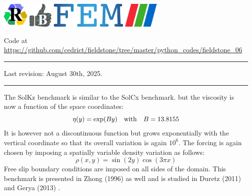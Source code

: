 \noindent
\includegraphics[height=1.25cm]{images/pictograms/replication}
\includegraphics[height=1.25cm]{images/pictograms/benchmark}
\includegraphics[height=1.25cm]{images/pictograms/FEM}
\includegraphics[height=1.25cm]{images/pictograms/paraview}


%

\begin{center}
\inpython
{\small Code at \url{https://github.com/cedrict/fieldstone/tree/master/python_codes/fieldstone_06}}
\end{center}

\par\noindent\rule{\textwidth}{0.4pt}

Last revision: August 30th, 2025.

\par\noindent\rule{\textwidth}{0.4pt}


The SolKz benchmark \cite{repa87} is similar to the SolCx benchmark.
but the viscosity is now a function of the space coordinates: 
\begin{equation}
\eta(y)=\exp(By) \quad {\rm with} \quad B=13.8155
\end{equation}
It is however not a discontinuous function but grows exponentially with the vertical coordinate so that its overall variation is again $10^6$. 
The forcing is again chosen by imposing a spatially variable density variation as follows:
\begin{equation}
\rho(x,y)=\sin(2y) \cos(3\pi x)
\end{equation}
Free slip boundary conditions are imposed on all sides of the domain.
This benchmark is presented in Zhong (1996) \cite{zhon96} as well and is studied 
in Duretz \etal (2011) \cite{dumg11} and Gerya \etal (2013) \cite{gemd13}.

